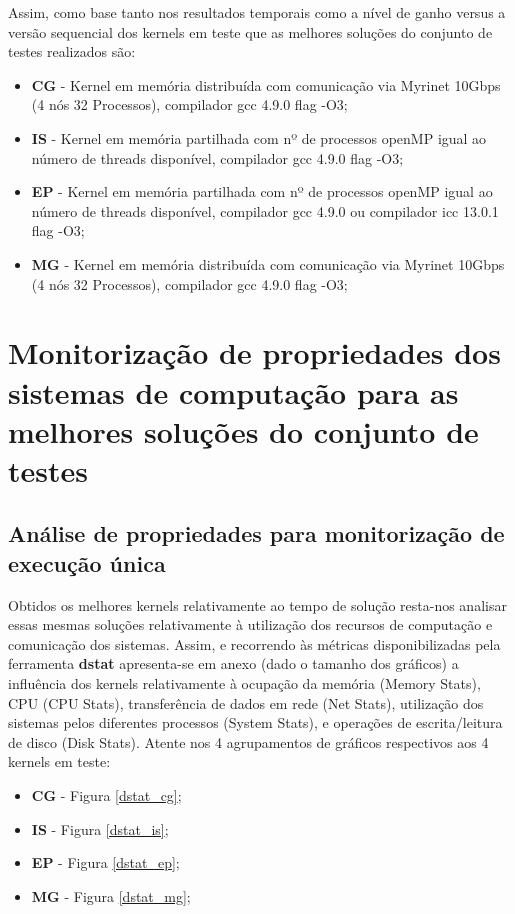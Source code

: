 \documentclass[conference,compsoc]{IEEEtran}
\begin{document}
Assim, como base tanto nos resultados temporais como a nível de ganho versus a versão sequencial dos kernels em teste que as melhores soluções do conjunto de testes realizados são:



\begin{itemize}
\item \textbf{CG} - Kernel em memória distribuída com comunicação via Myrinet 10Gbps (4 nós 32 Processos), compilador gcc 4.9.0 flag -O3;
\item \textbf{IS} - Kernel em memória partilhada com nº de processos openMP igual ao número de threads disponível, compilador gcc 4.9.0 flag -O3;
\item \textbf{EP} - Kernel em memória partilhada com nº de processos openMP igual ao número de threads disponível, compilador gcc 4.9.0 ou compilador icc 13.0.1 flag -O3;
\item \textbf{MG} - Kernel em memória distribuída com comunicação via Myrinet 10Gbps (4 nós 32 Processos), compilador gcc 4.9.0 flag -O3;

\end{itemize}

\section{Monitorização de propriedades dos sistemas de computação para as melhores soluções do conjunto de testes}

\subsection{Análise de propriedades para monitorização de execução única}
\label{subsec:monitor}	

Obtidos os melhores kernels relativamente ao tempo de solução resta-nos analisar essas mesmas soluções relativamente à utilização dos recursos de computação e comunicação dos sistemas. Assim, e recorrendo às métricas disponibilizadas pela ferramenta \textbf{dstat} apresenta-se em anexo (dado o tamanho dos gráficos) a influência dos kernels relativamente à ocupação da memória (Memory Stats), CPU (CPU Stats), transferência de dados em rede (Net Stats), utilização dos sistemas pelos diferentes processos (System Stats), e operações de escrita/leitura de disco (Disk Stats). Atente nos 4 agrupamentos de gráficos respectivos aos 4 kernels em teste:

\begin{itemize}
\item \textbf{CG} - Figura \ref{dstat_cg};
\item \textbf{IS} - Figura \ref{dstat_is};
\item \textbf{EP} - Figura \ref{dstat_ep};
\item \textbf{MG} - Figura \ref{dstat_mg};

\end{itemize}
\end{document}
